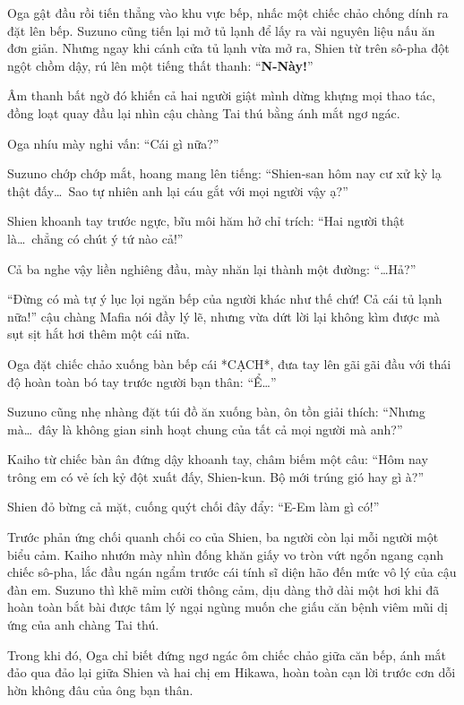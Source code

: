 \documentclass[../main.tex]{subfiles}
\begin{document}
Oga gật đầu rồi tiến thẳng vào khu vực bếp, nhấc một chiếc chảo chống dính ra đặt lên bếp. Suzuno cũng tiến lại mở tủ lạnh để lấy ra vài nguyên liệu nấu ăn đơn giản. Nhưng ngay khi cánh cửa tủ lạnh vừa mở ra, Shien từ trên sô-pha đột ngột chồm dậy, rú lên một tiếng thất thanh: ``\textbf{N-Này!}''


Âm thanh bất ngờ đó khiến cả hai người giật mình dừng khựng mọi thao tác, đồng loạt quay đầu lại nhìn cậu chàng Tai thú bằng ánh mắt ngơ ngác.

Oga nhíu mày nghi vấn: ``Cái gì nữa?''

Suzuno chớp chớp mắt, hoang mang lên tiếng: ``Shien-san hôm nay cư xử kỳ lạ thật đấy\dots\ Sao tự nhiên anh lại cáu gắt với mọi người vậy ạ?''

Shien khoanh tay trước ngực, bĩu môi hăm hở chỉ trích: ``Hai người thật là\dots\ chẳng có chút ý tứ nào cả!''

Cả ba nghe vậy liền nghiêng đầu, mày nhăn lại thành một đường: ``\dots Hả?''

``Đừng có mà tự ý lục lọi ngăn bếp của người khác như thế chứ! Cả cái tủ lạnh nữa!'' cậu chàng Mafia nói đầy lý lẽ, nhưng vừa dứt lời lại không kìm được mà sụt sịt hắt hơi thêm một cái nữa.

Oga đặt chiếc chảo xuống bàn bếp cái *CẠCH*, đưa tay lên gãi gãi đầu với thái độ hoàn toàn bó tay trước người bạn thân: ``Ể\dots''

Suzuno cũng nhẹ nhàng đặt túi đồ ăn xuống bàn, ôn tồn giải thích: ``Nhưng mà\dots\ đây là không gian sinh hoạt chung của tất cả mọi người mà anh?''

Kaiho từ chiếc bàn ân đứng dậy khoanh tay, châm biếm một câu: ``Hôm nay trông em có vẻ ích kỷ đột xuất đấy, Shien-kun. Bộ mới trúng gió hay gì à?''

Shien đỏ bừng cả mặt, cuống quýt chối đây đẩy: ``E-Em làm gì có!''

Trước phản ứng chối quanh chối co của Shien, ba người còn lại mỗi người một biểu cảm. Kaiho nhướn mày nhìn đống khăn giấy vo tròn vứt ngổn ngang cạnh chiếc sô-pha, lắc đầu ngán ngẩm trước cái tính sĩ diện hão đến mức vô lý của cậu đàn em. Suzuno thì khẽ mỉm cười thông cảm, dịu dàng thở dài một hơi khi đã hoàn toàn bắt bài được tâm lý ngại ngùng muốn che giấu căn bệnh viêm mũi dị ứng của anh chàng Tai thú.

Trong khi đó, Oga chỉ biết đứng ngơ ngác ôm chiếc chảo giữa căn bếp, ánh mắt đảo qua đảo lại giữa Shien và hai chị em Hikawa, hoàn toàn cạn lời trước cơn dỗi hờn không đâu của ông bạn thân.
\end{document}
